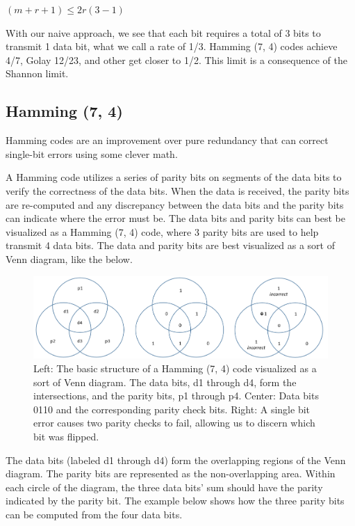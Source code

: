 \documentclass[12pt]{article}
\begin{document}
$(m + r + 1) ≤ 2 r (3-1)$ \cite{tanenbaum}

With our naive approach, we see that each bit requires a total of 3 bits to transmit 1 data bit, what we call a rate of 1/3. Hamming (7, 4) codes achieve 4/7, Golay 12/23, and other get closer to 1/2. This limit is a consequence of the Shannon limit. \cite{pless}

\subsection{Hamming (7, 4)}

Hamming codes are an improvement over pure redundancy that can correct single-bit errors using some clever math. 

A Hamming code utilizes a series of parity bits on segments of the data bits to verify the correctness of the data bits. When the data is received, the parity bits are re-computed and any discrepancy between the data bits and the parity bits can indicate where the error must be. The data bits and parity bits can best be visualized as a Hamming (7, 4) code, where 3 parity bits are used to help transmit 4 data bits. The data and parity bits are best visualized as a sort of Venn diagram, like the below.

\begin{figure}[h!]
 \centering
 \includegraphics[width=\textwidth]{img/Hamming.png}
 \caption{Left: The basic structure of a Hamming (7, 4) code visualized as a sort of Venn diagram. The data bits, d1 through d4, form the intersections, and the parity bits, p1 through p4. Center: Data bits 0110 and the corresponding parity check bits. Right: A single bit error causes two parity checks to fail, allowing us to discern which bit was flipped.}
 \label{fig:hamming}
 \end{figure}

The data bits (labeled d1 through d4) form the overlapping regions of the Venn diagram. The parity bits are represented as the non-overlapping area. Within each circle of the diagram, the three data bits' sum should have the parity indicated by the parity bit. The example below shows how the three parity bits can be computed from the four data bits.
\end{document}
